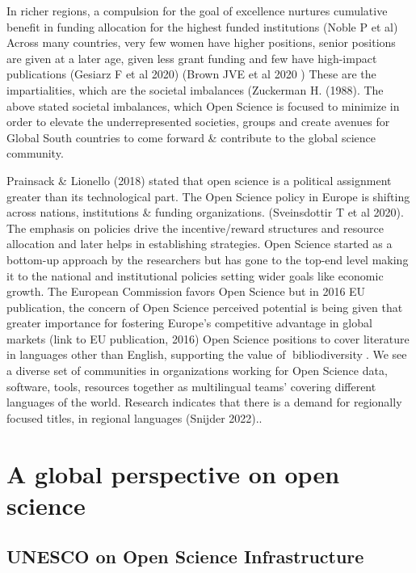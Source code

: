 \documentclass[
  letterpaper,
  DIV=11,
  numbers=noendperiod]{scrreport}
\begin{document}
In richer regions, a compulsion for the goal of excellence nurtures
cumulative benefit in funding allocation for the highest funded
institutions (Noble P et al) Across many countries, very few women have
higher positions, senior positions are given at a later age, given less
grant funding and few have high-impact publications (Gesiarz F et al
2020) (Brown JVE et al 2020 ) These are the impartialities, which are
the societal imbalances (Zuckerman H. (1988). The above stated societal
imbalances, which Open Science is focused to minimize in order to
elevate the underrepresented societies, groups and create avenues for
Global South countries to come forward \& contribute to the global
science community.

Prainsack \& Lionello (2018) stated that open science is a political
assignment greater than its technological part. The Open Science policy
in Europe is shifting across nations, institutions \& funding
organizations. (Sveinsdottir T et al 2020). The emphasis on policies
drive the incentive/reward structures and resource allocation and later
helps in establishing strategies. Open Science started as a bottom-up
approach by the researchers but has gone to the top-end level making it
to the national and institutional policies setting wider goals like
economic growth. The European Commission favors Open Science but in 2016
EU publication, the concern of Open Science perceived potential is being
given that greater importance for fostering Europe's competitive
advantage in global markets (link to EU publication, 2016) Open Science
positions to cover literature in languages other than English,
supporting the value of 📖bibliodiversity📖. We see a diverse set of
communities in organizations working for Open Science data, software,
tools, resources together as multilingual teams' covering different
languages of the world. Research indicates that there is a demand for
regionally focused titles, in regional languages (Snijder 2022)..

\hypertarget{a-global-perspective-on-open-science}{%
\section{A global perspective on open
science}\label{a-global-perspective-on-open-science}}

\hypertarget{unesco-on-open-science-infrastructure}{%
\subsection{UNESCO on Open Science
Infrastructure}\label{unesco-on-open-science-infrastructure}}
\end{document}
